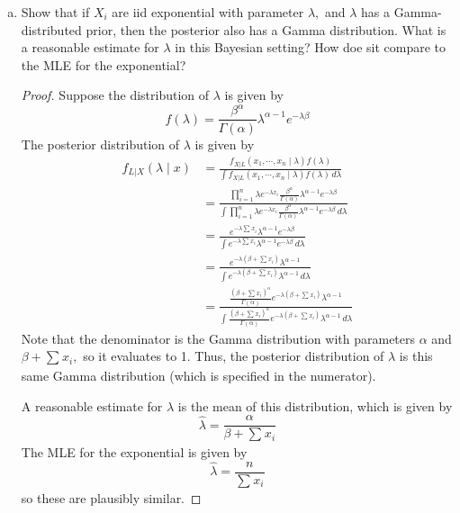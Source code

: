 \documentclass{article}
\begin{document}
\begin{enumerate}
\begin{enumerate}[(a)]
				\newpage
			\item Show that if $X_i$ are iid exponential with parameter $\lambda,$ and $\lambda$ has a Gamma-distributed prior, then the posterior also has a Gamma distribution. What is a reasonable estimate for $\lambda$ in this Bayesian setting? How doe sit compare to the MLE for the exponential?
				\begin{proof}
					Suppose the distribution of $\lambda$ is given by \[f(\lambda)=\frac{\beta^{\alpha}}{\Gamma(\alpha)}\lambda^{\alpha-1} e^{-\lambda\beta}\] The posterior distribution of $\lambda$ is given by
					\begin{align*}
						f_{L|X}(\lambda\mid x) &= \frac{f_{X|L}(x_1, \cdots, x_n\mid \lambda) f(\lambda)}{\int f_{X|L}(x_1, \cdots, x_n\mid\lambda) f(\lambda)\, d\lambda} \\
						&= \frac{\displaystyle \prod_{i=1}^{n} \lambda e^{-\lambda x_i} \frac{\beta^{\alpha}}{\Gamma(\alpha)}\lambda^{\alpha-1}e^{-\lambda\beta}}{\displaystyle\int \prod_{i=1}^{n} \lambda e^{-\lambda x_i} \frac{\beta^{\alpha}}{\Gamma(\alpha)}\lambda^{\alpha-1}e^{-\lambda\beta}\, d\lambda} \\
						&= \frac{e^{-\lambda\sum_{}^{}x_i} \lambda^{\alpha-1} e^{-\lambda\beta}}{\displaystyle \int e^{-\lambda\sum_{}^{}x_i} \lambda^{\alpha-1} e^{-\lambda\beta}\, d\lambda} \\
						&= \frac{e^{-\lambda\left( \beta+\sum_{}^{}x_i \right)}\lambda^{\alpha-1} }{\displaystyle\int e^{-\lambda\left( \beta+\sum_{}^{}x_i \right)}\lambda^{\alpha-1}\, d\lambda} \\
						&= \frac{\frac{\left( \beta+\sum_{}^{}x_i \right)^\alpha}{\Gamma(\alpha)}e^{-\lambda\left( \beta+\sum_{}^{}x_i \right)} \lambda^{\alpha-1}}{\displaystyle\int \frac{\left( \beta+\sum_{}^{}x_i \right)^\alpha}{\Gamma(\alpha)}e^{-\lambda\left( \beta+\sum_{}^{}x_i \right)} \lambda^{\alpha-1}\, d\lambda}
					\end{align*} 
					Note that the denominator is the Gamma distribution with parameters $\alpha$ and $\beta+\sum_{}^{}x_i,$ so it evaluates to 1. Thus, the posterior distribution of $\lambda$ is this same Gamma distribution (which is specified in the numerator). 

					A reasonable estimate for $\lambda$ is the mean of this distribution, which is given by \[\hat{\lambda}=\frac{\alpha}{\beta+\sum_{}^{}x_i}\] The MLE for the exponential is given by \[\hat{\lambda} = \frac{n}{\sum_{}^{}x_i}\] so these are plausibly similar.
					
				\end{proof}
				

\end{enumerate}
\end{enumerate}
\end{document}
